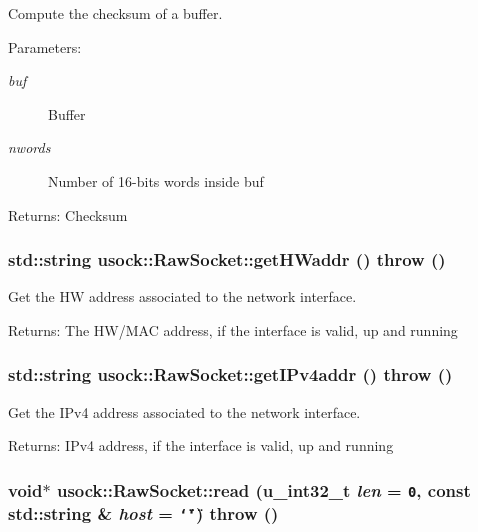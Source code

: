 Compute the checksum of a buffer. 

\begin{Desc}
\item[Parameters:]
\begin{description}
\item[{\em buf}]Buffer \item[{\em nwords}]Number of 16-bits words inside buf \end{description}
\end{Desc}
\begin{Desc}
\item[Returns:]Checksum \end{Desc}
\hypertarget{classusock_1_1RawSocket_1276f5fcc7bc3b41d9d11055887ab7a9}{
\subsubsection[{getHWaddr}]{\setlength{\rightskip}{0pt plus 5cm}std::string usock::RawSocket::getHWaddr ()  throw ()}}
\label{classusock_1_1RawSocket_1276f5fcc7bc3b41d9d11055887ab7a9}


Get the HW address associated to the network interface. 

\begin{Desc}
\item[Returns:]The HW/MAC address, if the interface is valid, up and running \end{Desc}
\hypertarget{classusock_1_1RawSocket_3b0c8f2f539982c8f37a66ebc29746a0}{
\subsubsection[{getIPv4addr}]{\setlength{\rightskip}{0pt plus 5cm}std::string usock::RawSocket::getIPv4addr ()  throw ()}}
\label{classusock_1_1RawSocket_3b0c8f2f539982c8f37a66ebc29746a0}


Get the IPv4 address associated to the network interface. 

\begin{Desc}
\item[Returns:]IPv4 address, if the interface is valid, up and running \end{Desc}
\hypertarget{classusock_1_1RawSocket_07bc901bc9b902122cca8a41f8c5c02a}{
\subsubsection[{read}]{\setlength{\rightskip}{0pt plus 5cm}void$\ast$ usock::RawSocket::read (u\_\-int32\_\-t {\em len} = {\tt 0}, \/  const std::string \& {\em host} = {\tt \char`\"{}\char`\"{}})  throw ()}}
\label{classusock_1_1RawSocket_07bc901bc9b902122cca8a41f8c5c02a}


